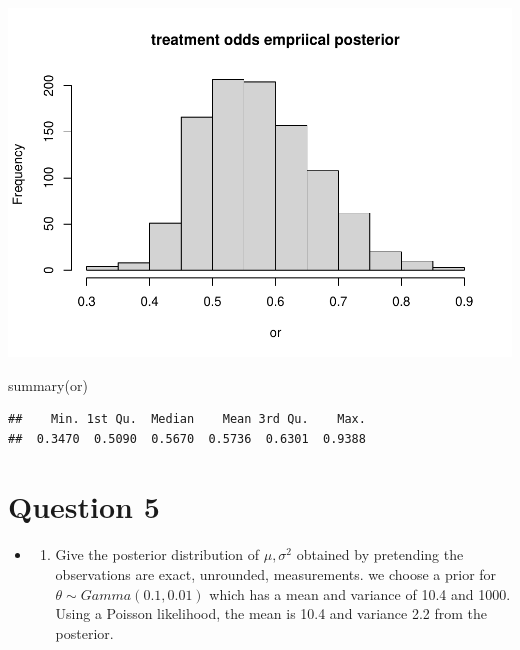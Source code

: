 \documentclass[
]{book}
\newenvironment{Shaded}{\begin{snugshade}}{\end{snugshade}}
\newcommand{\FunctionTok}[1]{\textcolor[rgb]{0.00,0.00,0.00}{#1}}
\newcommand{\NormalTok}[1]{#1}
\providecommand{\tightlist}{%
  \setlength{\itemsep}{0pt}\setlength{\parskip}{0pt}}
\theoremstyle{definition}
\theoremstyle{definition}
\theoremstyle{definition}
\theoremstyle{definition}
\theoremstyle{remark}
\begin{document}
\includegraphics{_main_files/figure-latex/unnamed-chunk-38-2.pdf}

\begin{Shaded}
\begin{Highlighting}[]
  \FunctionTok{summary}\NormalTok{(or)}
\end{Highlighting}
\end{Shaded}

\begin{verbatim}
##    Min. 1st Qu.  Median    Mean 3rd Qu.    Max. 
##  0.3470  0.5090  0.5670  0.5736  0.6301  0.9388
\end{verbatim}

\hypertarget{question-5}{%
\section*{Question 5}\label{question-5}}

\begin{itemize}
\item
  \begin{enumerate}
  \def\labelenumi{(\alph{enumi})}
  \tightlist
  \item
    Give the posterior distribution of \(\mu, \sigma^2\) obtained by pretending the observations are exact, unrounded, measurements. we choose a prior for \(\theta \sim Gamma(0.1,0.01)\) which has a mean and variance of 10.4 and 1000. Using a Poisson likelihood, the mean is 10.4 and variance 2.2 from the posterior.
  \end{enumerate}
\end{itemize}
\end{document}
